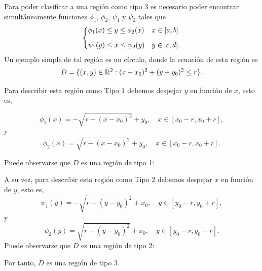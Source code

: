 \begin{example}
    Para poder clasificar a una regi\'on como tipo 3 es necesario poder encontrar simult\'aneamente funciones $\phi_1$, $\phi_2$, $\psi_1$ y $\psi_2$ tales que
    \[
    \begin{dcases}
        \phi_1(x)\leq y\leq\phi_2(x) & x\in[a,b]\\[.2cm]
        \psi_1(y)\leq x\leq\psi_2(y) & y\in[c,d].
    \end{dcases}
    \]
    Un ejemplo simple de tal regi\'on es un c\'irculo, donde la ecuaci\'on de esta regi\'on es $$D=\{(x,y)\in\mathbb{R}^2:(x-x_0)^2+(y-y_0)^2\leq r\}.$$  

    

    Para describir esta regi\'on como Tipo $1$  debemos despejar $y$ en funci\'on de $x$, esto es,
 

   \[
        \phi_1(x)=-\sqrt{r-(x-x_0)^2}+y_0,\quad x\in[x_0-r,x_0+r],
    \]
    y
    \[
        \phi_2(x)=\sqrt{r-(x-x_0)^2}+y_0,\quad x\in[x_0-r,x_0+r].
    \]

    Puede observarse que $D$ es una regi\'on de tipo 1:

    \begin{figure}[htbp]
    \centering
     
    \label{fig:tipo 1}
\end{figure}


    A su vez,  para describir esta regi\'on como Tipo $2$  debemos despejar $x$ en funci\'on de $y$, esto es, 
    \[
        \psi_1(y)=-\sqrt{r-(y-y_0)^2}+x_0,\quad y\in[y_0-r,y_0+r],
    \]
    y
    \[
        \psi_2(y)=\sqrt{r-(y-y_0)^2}+x_0,\quad y\in[y_0-r,y_0+r].
    \]
    Puede observarse que $D$ es una regi\'on de tipo 2:
 \begin{figure}[htbp]
    \centering
     
    \label{fig:interpretacion fisica}
\end{figure}
    Por tanto, $D$ es una regi\'on de tipo 3.
\end{example}

